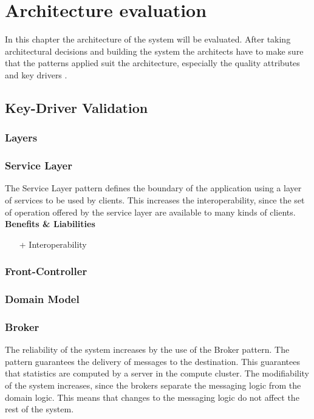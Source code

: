 
\newcommand{\bo}[1]{\textbf{#1}}

\chapter{Architecture evaluation}
\label{ch:evaluation}

In this chapter the architecture of the system will be evaluated. After taking architectural decisions and building the system the architects have to make sure that the patterns applied suit the architecture, especially the quality attributes and key drivers .%

\section{Key-Driver Validation}

\subsection*{Layers}
\subsection*{Service Layer}
The Service Layer pattern defines the boundary of the application using a layer of services to be used by clients. This increases the interoperability, since the set of operation offered by the service layer are available to many kinds of clients. \\
\textbf{Benefits \& Liabilities} ~
\begin{itemize}
\item[+] Interoperability 
\end{itemize}

\subsection*{Front-Controller}
\subsection*{Domain Model}
\subsection*{Broker}
The reliability of the system increases by the use of the Broker pattern. The pattern guarantees the delivery of messages to the destination. This guarantees that statistics are computed by a server in the compute cluster.
The modifiability of the system increases, since the brokers separate the messaging logic from the domain logic. This means that changes to the messaging logic do not affect the rest of the system.

